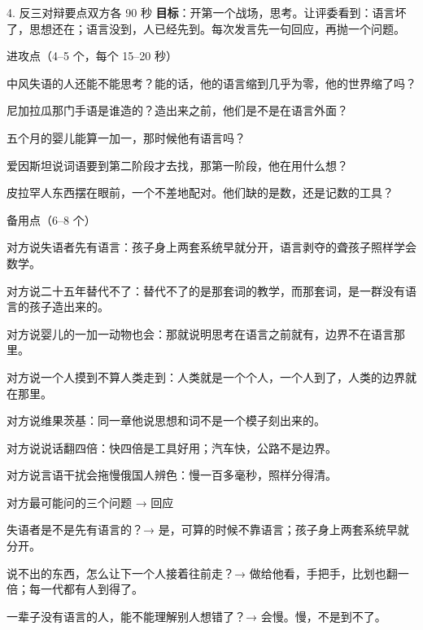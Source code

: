 \documentclass[script,con]{debate}
\begin{document}
\begin{stage}{4. 反三对辩要点}{双方各 90 秒}
\textbf{目标}：开第一个战场，思考。让评委看到：语言坏了，思想还在；语言没到，人已经先到。每次发言先一句回应，再抛一个问题。
\begin{points}{进攻点（4–5 个，每个 15–20 秒）}
\item 中风失语的人还能不能思考？能的话，他的语言缩到几乎为零，他的世界缩了吗？
\item 尼加拉瓜那门手语是谁造的？造出来之前，他们是不是在语言外面？
\item 五个月的婴儿能算一加一，那时候他有语言吗？
\item 爱因斯坦说词语要到第二阶段才去找，那第一阶段，他在用什么想？
\item 皮拉罕人东西摆在眼前，一个不差地配对。他们缺的是数，还是记数的工具？
\end{points}
\begin{points}{备用点（6–8 个）}
\item 对方说失语者先有语言：孩子身上两套系统早就分开，语言剥夺的聋孩子照样学会数学。
\item 对方说二十五年替代不了：替代不了的是那套词的教学，而那套词，是一群没有语言的孩子造出来的。
\item 对方说婴儿的一加一动物也会：那就说明思考在语言之前就有，边界不在语言那里。
\item 对方说一个人摸到不算人类走到：人类就是一个个人，一个人到了，人类的边界就在那里。
\item 对方说维果茨基：同一章他说思想和词不是一个模子刻出来的。
\item 对方说说话翻四倍：快四倍是工具好用；汽车快，公路不是边界。
\item 对方说言语干扰会拖慢俄国人辨色：慢一百多毫秒，照样分得清。
\end{points}
\begin{points}{对方最可能问的三个问题 → 回应}
\item 失语者是不是先有语言的？→ 是，可算的时候不靠语言；孩子身上两套系统早就分开。
\item 说不出的东西，怎么让下一个人接着往前走？→ 做给他看，手把手，比划也翻一倍；每一代都有人到得了。
\item 一辈子没有语言的人，能不能理解别人想错了？→ 会慢。慢，不是到不了。
\end{points}
\end{stage}
\end{document}
